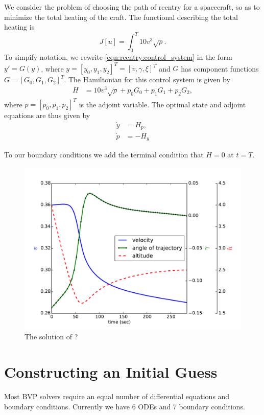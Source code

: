 We consider the problem of choosing the path of reentry for a spacecraft, so as to minimize the total heating of the craft. 
The functional describing the total heating is 
\[
J[u] = \int_0^T 10v^3 \sqrt{\rho}.
\]
To simpify notation, we rewrite \eqref{eqn:reentry:control_system} in the form $y' = G(y)$, where $y = [y_0, y_1, y_2]^T=[v,\gamma, \xi]^T$ and $G$ has component functions $G = [G_0, G_1, G_2]^T$. The Hamiltonian for this control system is given by 
\begin{align}
H &=  10v^3 \sqrt{\rho} + p_0G_0 + p_1G_1 + p_2G_2,
\end{align}
where $p = [p_0,p_1,p_2]^T$ is the adjoint variable. 
The optimal state and adjoint equations are thus given by 
\begin{align}
	\dot{y} &= H_{p},\\
	\dot{p} &= -H_{y} \label{eqn:reentry:adjoint_system}
\end{align}

To our boundary conditions we add the terminal condition that $H = 0$ at $t = T$.

\begin{figure}
\centering
\includegraphics[width=\textwidth]{solutions.pdf}
\caption{The solution of ?%
}
\label{fig:reentry:solutions}
\end{figure}



\section*{Constructing an Initial Guess}
Most BVP solvers require an equal number of differential equations and boundary conditions. Currently we have 6 ODEs and 7 boundary conditions. 

